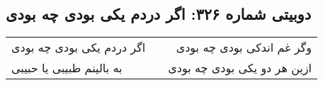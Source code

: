 \begin{center}
\section*{دوبیتی شماره ۳۲۶: اگر دردم یکی بودی چه بودی}
\label{sec:326}
\begin{longtable}{l p{0.5cm} r}
اگر دردم یکی بودی چه بودی
&&
وگر غم اندکی بودی چه بودی
\\
به بالینم طبیبی یا حبیبی
&&
ازین هر دو یکی بودی چه بودی
\\
\end{longtable}
\end{center}

